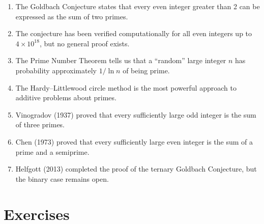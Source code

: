 \begin{enumerate}
    \item The Goldbach Conjecture states that every even integer greater than 2 can be expressed as the sum of two primes.
    \item The conjecture has been verified computationally for all even integers up to $4 \times 10^{18}$, but no general proof exists.
    \item The Prime Number Theorem tells us that a ``random'' large integer $n$ has probability approximately $1/\ln n$ of being prime.
    \item The Hardy--Littlewood circle method is the most powerful approach to additive problems about primes.
    \item Vinogradov (1937) proved that every sufficiently large odd integer is the sum of three primes.
    \item Chen (1973) proved that every sufficiently large even integer is the sum of a prime and a semiprime.
    \item Helfgott (2013) completed the proof of the ternary Goldbach Conjecture, but the binary case remains open.
\end{enumerate}

\section{Exercises}

